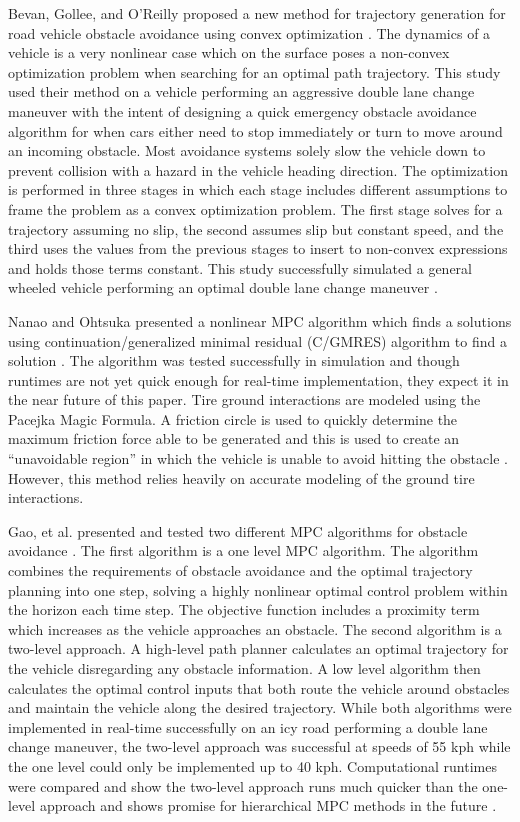 \documentclass[12pt,onecolumn]{report}
\begin{document}
Bevan, Gollee, and O'Reilly proposed a new method for trajectory generation for road vehicle obstacle avoidance using convex optimization \cite{Bevan&Gollee2010}. The dynamics of a vehicle is a very nonlinear case which on the surface poses a non-convex optimization problem when searching for an optimal path trajectory. This study used their method on a vehicle performing an aggressive double lane change maneuver with the intent of designing a quick emergency obstacle avoidance algorithm for when cars either need to stop immediately or turn to move around an incoming obstacle. Most avoidance systems solely slow the vehicle down to prevent collision with a hazard in the vehicle heading direction. The optimization is performed in three stages in which each stage includes different assumptions to frame the problem as a convex optimization problem. The first stage solves for a trajectory assuming no slip, the second assumes slip but constant speed, and the third uses the values from the previous stages to insert to non-convex expressions and holds those terms constant. This study successfully simulated a general wheeled vehicle performing an optimal double lane change maneuver \cite{Bevan&Gollee2010}.

Nanao and Ohtsuka presented a nonlinear MPC algorithm which finds a solutions using continuation/generalized minimal residual (C/GMRES) algorithm to find a solution \cite{Nanao&Ohtsuka2010}. The algorithm was tested successfully in simulation and though runtimes are not yet quick enough for real-time implementation, they expect it in the near future of this paper. Tire ground interactions are modeled using the Pacejka Magic Formula. A friction circle is used to quickly determine the maximum friction force able to be generated and this is used to create an ``unavoidable region'' in which the vehicle is unable to avoid hitting the obstacle \cite{Nanao&Ohtsuka2010}. However, this method relies heavily on accurate modeling of the ground tire interactions.

Gao, et al. presented and tested two different MPC algorithms for obstacle avoidance \cite{Gao&Borrelli2010}. The first algorithm is a one level MPC algorithm. The algorithm combines the requirements of obstacle avoidance and the optimal trajectory planning into one step, solving a highly nonlinear optimal control problem within the horizon each time step. The objective function includes a proximity term which increases as the vehicle approaches an obstacle. The second algorithm is a two-level approach. A high-level path planner calculates an optimal trajectory for the vehicle disregarding any obstacle information. A low level algorithm then calculates the optimal control inputs that both route the vehicle around obstacles and maintain the vehicle along the desired trajectory. While both algorithms were implemented in real-time successfully on an icy road performing a double lane change maneuver, the two-level approach was successful at speeds of 55 kph while the one level could only be implemented up to 40 kph. Computational runtimes were compared and show the two-level approach runs much quicker than the one-level approach and shows promise for hierarchical MPC methods in the future \cite{Gao&Borrelli2010}.
\end{document}
